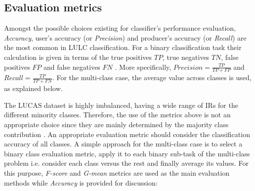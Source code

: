 \documentclass[remotesensing,article,submit,moreauthors,pdftex]{Definitions/mdpi}
\begin{document}

\subsection{Evaluation metrics}  \label{Evaluation metrics}

Amongst the possible choices existing for classifier's performance evaluation,
\textit{Accuracy}, user's accuracy (or \textit{Precision}) and
producer's accuracy (or \textit{Recall}) are the most common in LULC
classification. For a binary classification task their calculation is given in
terms of the true positives \( TP \), true negatives \(TN \), false positives
\( FP \) and false negatives \( FN \)
\cite{Liu2007}. More specifically,  \( \textit{Precision} =  \frac{TP}{TP + FP}
\) and \(\textit{Recall} =  \frac{TP}{TP + FN} \). For the multi-class case, the
average value across classes is used, as explained below.

The LUCAS dataset is highly imbalanced, having a wide range of IRs for the
different minority classes. Therefore, the use of the metrics above is not an
appropriate choice since they are mainly determined by the majority class
contribution \cite{He2009}. An appropriate evaluation metric should consider the
classification accuracy of all classes. A simple approach for the multi-class
case is to select a binary class evaluation metric, apply it to each binary
sub-task of the multi-class problem i.e. consider each class versus the rest and
finally average its values. For this purpose, \textit{F-score} and
\textit{G-mean} metrics are used as the main evaluation methods while
\textit{Accuracy} is provided for discussion:
\end{document}

